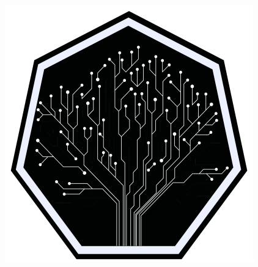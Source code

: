 
\begin{titlepage}
	\begin{center}
		\includegraphics[scale=0.6]{img/logo} \\ %
		\vspace{1cm} %
		
		{\LARGE \DocAuthor} \\ %
		\vspace{0.5cm} %
		
		{\Huge \textbf{\DocTitle}} \\ %
		\vspace{0.5cm}
		
		\DocDate \\ %
		\vspace{1cm}
		
		

\end{center}
\end{titlepage}
